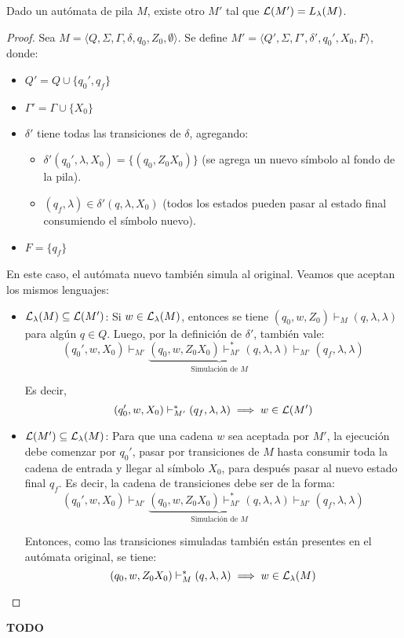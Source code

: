 \begin{theorem*}
    Dado un autómata de pila $M$, existe otro $M'$ tal que $\mathcal{L}(M') = L_\lambda(M)$.
\end{theorem*}
\begin{proof}
    Sea $M = \langle Q, \Sigma, \Gamma, \delta, q_0, Z_0, \emptyset \rangle$. Se define $M' = \langle Q', \Sigma, \Gamma', \delta', q_0', X_0, F \rangle$, donde:
    \begin{itemize}
        \item $Q' = Q \cup \{q_0', q_f\}$
        \item $\Gamma' = \Gamma \cup \{X_0\}$
        \item $\delta'$ tiene todas las transiciones de $\delta$, agregando:
        \begin{itemize}
            \item $\delta'(q_0', \lambda, X_0) = \{(q_0, Z_0 X_0)\}$ (se agrega un nuevo símbolo al fondo de la pila).
            \item $(q_f, \lambda) \in \delta'(q, \lambda, X_0)$ (todos los estados pueden pasar al estado final consumiendo el símbolo nuevo).
        \end{itemize}
        \item $F = \{q_f\}$
    \end{itemize}

    En este caso, el autómata nuevo también simula al original. Veamos que aceptan los mismos lenguajes:
    \begin{itemize}
        \item $\mathcal{L}_\lambda(M) \subseteq \mathcal{L}(M')$: Si $w \in \mathcal{L}_\lambda(M)$, entonces se tiene $(q_0, w, Z_0) \vdash_M (q, \lambda, \lambda)$ para algún $q \in Q$. Luego, por la definición de $\delta'$, también vale:
        $$
            (q_0', w, X_0) \vdash_{M'} \underbrace{(q_0, w, Z_0 X_0) \vdash_{M'}^* (q, \lambda, \lambda)}_{\text{Simulación de } M} \vdash_{M'} (q_f, \lambda, \lambda)
        $$

        Es decir,
        $$
            (q_0', w, X_0) \vdash_{M'}^* (q_f, \lambda, \lambda) \implies w \in \mathcal{L}(M')
        $$
        \item $\mathcal{L}(M') \subseteq \mathcal{L}_\lambda(M)$: Para que una cadena $w$ sea aceptada por $M'$, la ejecución debe comenzar por $q_0'$, pasar por transiciones de $M$ hasta consumir toda la cadena de entrada y llegar al símbolo $X_0$, para después pasar al nuevo estado final $q_f$. Es decir, la cadena de transiciones debe ser de la forma:
        $$
            (q_0', w, X_0) \vdash_{M'} \underbrace{(q_0, w, Z_0 X_0) \vdash_{M'}^* (q, \lambda, \lambda)}_{\text{Simulación de } M} \vdash_{M'} (q_f, \lambda, \lambda)
        $$

        Entonces, como las transiciones simuladas también están presentes en el autómata original, se tiene:
        $$
            (q_0, w, Z_0 X_0) \vdash_M^* (q, \lambda, \lambda) \implies w \in \mathcal{L}_\lambda(M)
        $$
    \end{itemize}
\end{proof}

\textbf{TODO}
